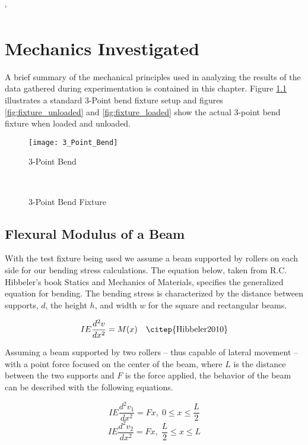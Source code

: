 `\chapter{Mechanics Investigated} \label{chap:mechanics}
	A brief summary of the mechanical principles used in analyzing the results of the data gathered during experimentation is contained in this chapter. Figure \ref{fig:3_Point_Bend} illustrates a standard 3-Point bend fixture setup and figures \ref{fig:fixture_unloaded} and \ref{fig:fixture_loaded} show the actual 3-point bend fixture when loaded and unloaded.
	
\begin{figure} [H]
\centering
	\caption{3-Point Bend}
	\texttt{[image: 3\_Point\_Bend]}
	\label{fig:3_Point_Bend}
\end{figure}



\begin{figure} [H]
\centering
	\caption{\label{ref_label_overall}3-Point Bend Fixture}
	\	
	\
\end{figure}

\section{Flexural Modulus of a Beam} \label{sec:modulus}
	With the test fixture being used we assume a beam supported by rollers on each side for our bending stress calculations. The equation below, taken from R.C. Hibbeler's book Statics and Mechanics of Materials, specifies the generalized equation for bending. The bending stress is characterized by the distance between supports, $d$, the height $h$, and width $w$ for the square and rectangular beams.

\begin{equation} \label{eq:1}
IE\frac{d^2v}{dx^2} = M(x)\quad \text{\citep{Hibbeler2010}}
\end{equation}

Assuming a beam supported by two rollers -- thus capable of lateral movement -- with a point force focused on the center of the beam, where $L$ is the distance between the two supports and $F$ is the force applied, the behavior of the beam can be described with the following equations.

\begin{equation} \label{eq:2}
IE\frac{d^2v_1}{dx^2} = Fx, \; 0 \leq x \leq \frac{L}{2}
\end{equation}
\begin{equation} \label{eq:3}
IE\frac{d^2v_2}{dx^2} = Fx, \; \frac{L}{2} \leq x \leq L
\end{equation}


